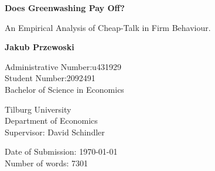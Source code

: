 \begin{titlepage}
    \begin{center}
        \vspace*{1cm}
 
        \Huge
        \textbf{Does Greenwashing Pay Off?}
 
        \vspace{0.5cm}
        An Empirical Analysis of Cheap-Talk in Firm Behaviour.
        
        \vspace{1.5cm}
        
        \textbf{Jakub Przewoski}
        
        \vspace{0.5cm}
        \Large
        Administrative Number:\@ u431929\\ 
        Student Number:\@ 2092491 \\
        Bachelor of Science in Economics \\
        
        \vfill
        
        Tilburg University\\
        Department of Economics\\
        Supervisor: David Schindler\\
        
        \vspace{0.8cm}
        
        Date of Submission: \today{} \\
        Number of words: 7301

            
    \end{center}
\end{titlepage}
